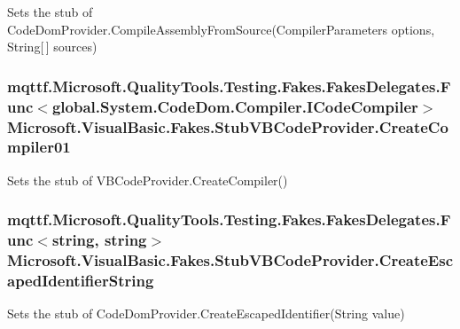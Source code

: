 Sets the stub of Code\-Dom\-Provider.\-Compile\-Assembly\-From\-Source(\-Compiler\-Parameters options, String\mbox{[}$\,$\mbox{]} sources)

\hypertarget{class_microsoft_1_1_visual_basic_1_1_fakes_1_1_stub_v_b_code_provider_abec2d63453b9f6004c87538c9e971286}{
\subsubsection[{Create\-Compiler01}]{\setlength{\rightskip}{0pt plus 5cm}mqttf.\-Microsoft.\-Quality\-Tools.\-Testing.\-Fakes.\-Fakes\-Delegates.\-Func$<$global.\-System.\-Code\-Dom.\-Compiler.\-I\-Code\-Compiler$>$ Microsoft.\-Visual\-Basic.\-Fakes.\-Stub\-V\-B\-Code\-Provider.\-Create\-Compiler01}}\label{class_microsoft_1_1_visual_basic_1_1_fakes_1_1_stub_v_b_code_provider_abec2d63453b9f6004c87538c9e971286}


Sets the stub of V\-B\-Code\-Provider.\-Create\-Compiler()

\hypertarget{class_microsoft_1_1_visual_basic_1_1_fakes_1_1_stub_v_b_code_provider_ab7b1d8e3c87b31a204441b0818ee4405}{
\subsubsection[{Create\-Escaped\-Identifier\-String}]{\setlength{\rightskip}{0pt plus 5cm}mqttf.\-Microsoft.\-Quality\-Tools.\-Testing.\-Fakes.\-Fakes\-Delegates.\-Func$<$string, string$>$ Microsoft.\-Visual\-Basic.\-Fakes.\-Stub\-V\-B\-Code\-Provider.\-Create\-Escaped\-Identifier\-String}}\label{class_microsoft_1_1_visual_basic_1_1_fakes_1_1_stub_v_b_code_provider_ab7b1d8e3c87b31a204441b0818ee4405}


Sets the stub of Code\-Dom\-Provider.\-Create\-Escaped\-Identifier(\-String value)

